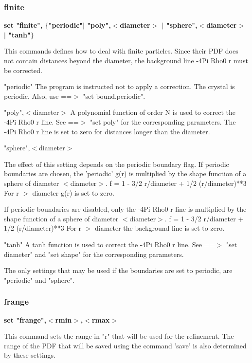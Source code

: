 \subsubsection{finite}
{\bf set "finite", $ \{$"periodic"$| $ "poly",$ <$diameter$> $ $| $ "sphere",$ <$diameter$> $ $| $ "tanh"$\} $ \par }
\par
\vspace{3pt}
This commands defines how to deal with finite particles. 
Since their PDF does not contain distances beyond the diameter, 
the background line -4Pi Rho0 r must be corrected. 
\par
"periodic" 
The program is instructed not to apply a correction. The crystal 
is periodic. Also, use ==$> $ "set bound,periodic". 
\par
"poly",$ <$diameter$> $ 
A polynomial function of order N is used to correct the -4Pi Rho0 r 
line. See ==$> $ "set poly" for the corresponding parameters. 
The -4Pi Rho0 r line is set to zero for distances longer than the 
diameter. 
\par
"sphere",$ <$diameter$> $ 
\par
The effect of this setting depends on the periodic boundary flag. 
If periodic boundaries are chosen, the 'periodic' g(r) is 
multiplied by the shape function of a sphere of diameter $ <$diameter$> $. 
f = 1 - 3/2 r/diameter + 1/2 (r/diameter)**3 
For r $> $ diameter g(r) is set to zero. 
\par
If periodic boundaries are disabled, only the -4Pi Rho0 r line 
is multiplied by the shape function of a sphere of diameter $ <$diameter$> $. 
f = 1 - 3/2 r/diameter + 1/2 (r/diameter)**3 
For r $> $ diameter the background line is set to zero. 
\par
"tanh" 
A tanh function is used to correct the -4Pi Rho0 r line. 
See ==$> $ "set diameter" and "set shape" for the corresponding 
parameters. 
\par
\par
The only settings that may be used if the boundaries are set to 
periodic, are "periodic" and "sphere". 
\subsubsection{frange}
{\bf set "frange",$ <$rmin$> $,$ <$rmax$> $ \par }
\par
\vspace{3pt}
This command sets the range in "r" that will be used for the 
refinement. The range of the PDF that will be saved using the 
command 'save' is also determined by these settings. 
